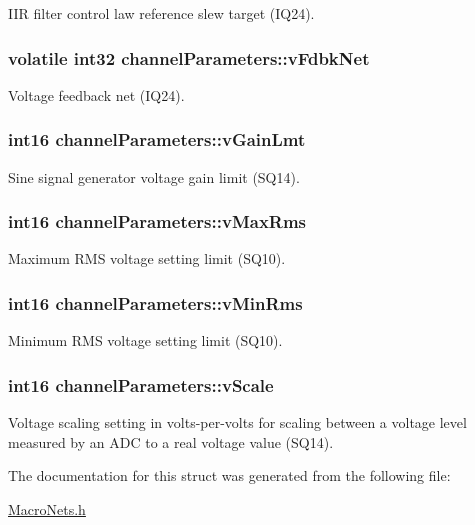 I\-I\-R filter control law reference slew target (I\-Q24). \hypertarget{structchannel_parameters_a5b3f0afc0e3ef0bc0726ee695570e787}{
\subsubsection[{v\-Fdbk\-Net}]{\setlength{\rightskip}{0pt plus 5cm}volatile int32 channel\-Parameters\-::v\-Fdbk\-Net}}\label{structchannel_parameters_a5b3f0afc0e3ef0bc0726ee695570e787}
Voltage feedback net (I\-Q24). \hypertarget{structchannel_parameters_a7dd5ddd959b3f3344721e729e51f0db5}{
\subsubsection[{v\-Gain\-Lmt}]{\setlength{\rightskip}{0pt plus 5cm}int16 channel\-Parameters\-::v\-Gain\-Lmt}}\label{structchannel_parameters_a7dd5ddd959b3f3344721e729e51f0db5}
Sine signal generator voltage gain limit (S\-Q14). \hypertarget{structchannel_parameters_a21e56dc9f903bbea9c980648a8ffc097}{
\subsubsection[{v\-Max\-Rms}]{\setlength{\rightskip}{0pt plus 5cm}int16 channel\-Parameters\-::v\-Max\-Rms}}\label{structchannel_parameters_a21e56dc9f903bbea9c980648a8ffc097}
Maximum R\-M\-S voltage setting limit (S\-Q10). \hypertarget{structchannel_parameters_af6a4d30899a436a77b24b99baa2852f6}{
\subsubsection[{v\-Min\-Rms}]{\setlength{\rightskip}{0pt plus 5cm}int16 channel\-Parameters\-::v\-Min\-Rms}}\label{structchannel_parameters_af6a4d30899a436a77b24b99baa2852f6}
Minimum R\-M\-S voltage setting limit (S\-Q10). \hypertarget{structchannel_parameters_a7bdcae99eedfaaa8bfda6088cec1c08d}{
\subsubsection[{v\-Scale}]{\setlength{\rightskip}{0pt plus 5cm}int16 channel\-Parameters\-::v\-Scale}}\label{structchannel_parameters_a7bdcae99eedfaaa8bfda6088cec1c08d}
Voltage scaling setting in volts-\/per-\/volts for scaling between a voltage level measured by an A\-D\-C to a real voltage value (S\-Q14). 

The documentation for this struct was generated from the following file\-:\begin{DoxyCompactItemize}
\item 
\hyperlink{_macro_nets_8h}{Macro\-Nets.\-h}\end{DoxyCompactItemize}
